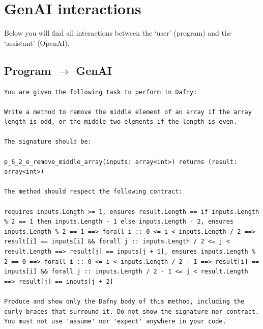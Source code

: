 \documentclass{article}
\begin{document}
\section*{GenAI interactions}
Below you will find all interactions between the `user' (program) and the `assistant' (OpenAI).
\subsection*{Program $\rightarrow$ GenAI}
\begin{lstlisting}
You are given the following task to perform in Dafny:

Write a method to remove the middle element of an array if the array length is odd, or the middle two elements if the length is even.

The signature should be:

p_6_2_e_remove_middle_array(inputs: array<int>) returns (result: array<int>)

The method should respect the following contract:

requires inputs.Length >= 1, ensures result.Length == if inputs.Length % 2 == 1 then inputs.Length - 1 else inputs.Length - 2, ensures inputs.Length % 2 == 1 ==> forall i :: 0 <= i < inputs.Length / 2 ==> result[i] == inputs[i] && forall j :: inputs.Length / 2 <= j < result.Length ==> result[j] == inputs[j + 1], ensures inputs.Length % 2 == 0 ==> forall i :: 0 <= i < inputs.Length / 2 - 1 ==> result[i] == inputs[i] && forall j :: inputs.Length / 2 - 1 <= j < result.Length ==> result[j] == inputs[j + 2]

Produce and show only the Dafny body of this method, including the curly braces that surround it. Do not show the signature nor contract. You must not use 'assume' nor 'expect' anywhere in your code.
\end{lstlisting}
\end{document}
